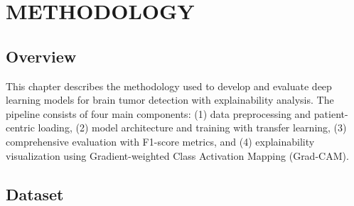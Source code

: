 \chapter{METHODOLOGY}
\label{ch:methodology}

\section{Overview}

This chapter describes the methodology used to develop and evaluate deep learning models for brain tumor detection with explainability analysis. The pipeline consists of four main components: (1) data preprocessing and patient-centric loading, (2) model architecture and training with transfer learning, (3) comprehensive evaluation with F1-score metrics, and (4) explainability visualization using Gradient-weighted Class Activation Mapping (Grad-CAM).

\section{Dataset}

